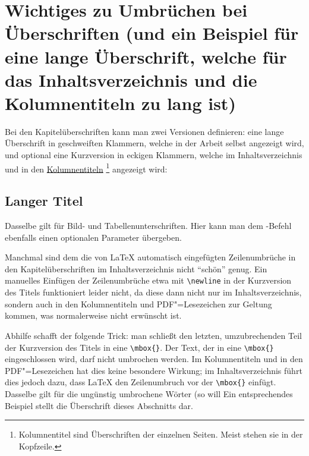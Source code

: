 \section[%
         Wichtiges zu Umbrüchen bei Überschriften
         \mbox{(Kurzversion für das Inhaltsverzeichnis etc.)}%
				]{%
         Wichtiges zu Umbrüchen bei Überschriften
         (und ein Beispiel \newline für eine lange Überschrift,
         welche \newline für das Inhaltsverzeichnis und 
         \newline die Kolumnentiteln zu lang ist)%
				}%
%
\label{chap:Titles}
%
%
Bei den Kapitelüberschriften kann man zwei Versionen definieren:
eine lange Überschrift in geschweiften Klammern, welche in der Arbeit selbst angezeigt wird, 
und optional eine Kurzversion in eckigen Klammern, welche im Inhaltsverzeichnis und in den 
\href{https://de.wikipedia.org/wiki/Kolumnentitel}{Kolumnentiteln}%
\footnote{Kolumnentitel sind Überschriften der einzelnen Seiten. Meist stehen sie in der Kopfzeile.}
angezeigt wird:
\begin{latex}
\section[Kurzversion]{Langer Titel}
\end{latex}
Dasselbe gilt für Bild- und Tabellenunterschriften. Hier kann man dem
-Befehl ebenfalls einen optionalen Parameter übergeben.

Manchmal sind dem  die von \LaTeX{} automatisch eingefügten Zeilenumbrüche in den Kapitelüberschriften im Inhaltsverzeichnis nicht \enquote{schön} genug.
Ein manuelles Einfügen der Zeilenumbrüche etwa mit \verb+\newline+ in der Kurzversion des Titels funktioniert leider nicht,
da diese dann nicht nur im Inhaltsverzeichnis, sondern auch in den Kolumnentiteln und PDF"=Lesezeichen zur Geltung kommen, 
was normalerweise nicht erwünscht ist.

Abhilfe schafft der folgende Trick:
man schließt den letzten, umzubrechenden Teil der Kurzversion des Titels in eine \verb+\mbox{}+.
Der Text, der in eine \verb+\mbox{}+ eingeschlossen wird, darf nicht umbrochen werden.
Im Kolumnentiteln und in den PDF"=Lesezeichen hat dies keine besondere Wirkung; im Inhaltsverzeichnis führt dies jedoch dazu, dass \LaTeX{} den Zeilenumbruch vor der \verb+\mbox{}+ einfügt.
Dasselbe gilt für die ungünstig umbrochene Wörter (so will 
Ein entsprechendes Beispiel stellt die Überschrift dieses Abschnitts dar.